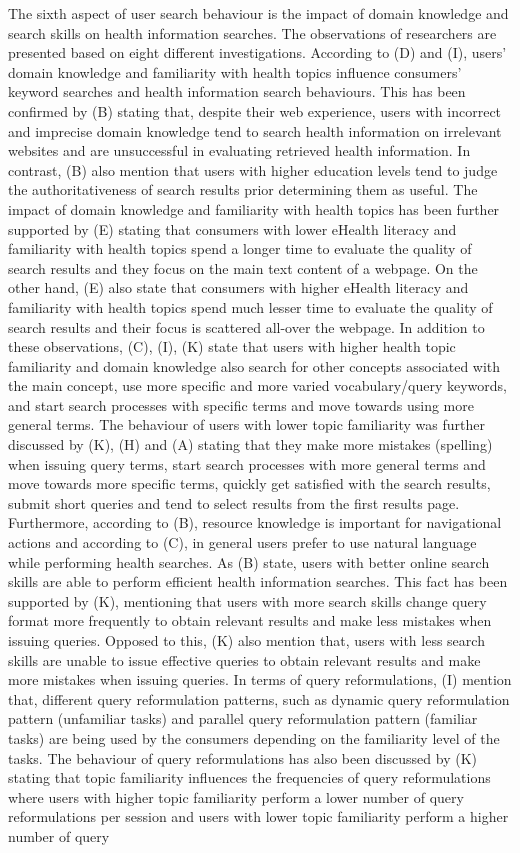 \documentclass[]{article}
\begin{document}
The sixth aspect of user search behaviour is the impact of domain knowledge and search skills on health information searches. The observations of researchers are presented based on eight different investigations. According to (D) and (I), users’ domain knowledge and familiarity with health topics influence consumers' keyword searches and health information search behaviours. This has been confirmed by (B) stating that, despite their web experience, users with incorrect and imprecise domain knowledge tend to search health information on irrelevant websites and are unsuccessful in evaluating retrieved health information. In contrast, (B) also mention that users with higher education levels tend to judge the authoritativeness of search results prior determining them as useful. The impact of domain knowledge and familiarity with health topics has been further supported by (E) stating that consumers with lower eHealth literacy and familiarity with health topics spend a longer time to evaluate the quality of search results and they focus on the main text content of a webpage. On the other hand, (E) also state that consumers with higher eHealth literacy and  familiarity with health topics spend much lesser time to evaluate the quality of search results and their focus is scattered all-over the webpage. In addition to these observations, (C), (I), (K) state that users with higher health topic familiarity and domain knowledge also search for other concepts associated with the main concept, use more specific and more varied vocabulary/query keywords, and start search processes with specific terms and move towards using more general terms. The behaviour of users with lower topic familiarity was further discussed by (K), (H) and (A) stating that they make more mistakes (spelling) when issuing query terms, start search processes with more general terms and move towards more specific terms, quickly get satisfied with the search results, submit short queries and tend to select results from the first results page. Furthermore, according to (B), resource knowledge is important for navigational actions and according to (C), in general users prefer to use natural language while performing health searches. As (B) state, users with better online search skills are able to perform efficient health information searches. This fact has been supported by (K), mentioning that users with more search skills change query format more frequently to obtain relevant results and make less mistakes when issuing queries. Opposed to this, (K) also mention that, users with less search skills are unable to issue effective queries to obtain relevant results and make more mistakes when issuing queries. In terms of query reformulations, (I) mention that, different query reformulation patterns, such as dynamic query reformulation pattern (unfamiliar tasks) and parallel query reformulation pattern (familiar tasks) are being used by the consumers depending on the familiarity level of the tasks. The behaviour of query reformulations has also been discussed by (K) stating that topic familiarity influences the frequencies of query reformulations where users with higher topic familiarity perform a lower number of query reformulations per session and users with lower topic familiarity perform a higher number of query 
\end{document}
